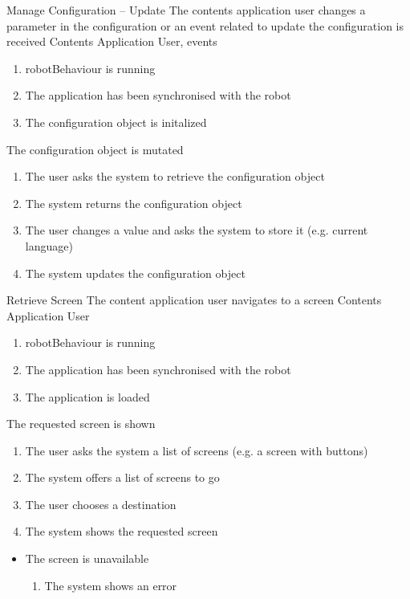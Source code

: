 \begin{suc}
{Manage Configuration -- Update}
{The contents application user changes a parameter in the configuration or an event related to update the configuration is received}
{Contents Application User, events}
{
	\begin{enumerate}
        \item robotBehaviour is running
        \item The application has been synchronised with the robot
        \item The configuration object is initalized
    \end{enumerate}
}
{
The configuration object is mutated
}
{
    \begin{enumerate}
        \item The user asks the system to retrieve the configuration object
        \item The system returns the configuration object
        \item The user changes a value and asks the system to store it (e.g. current language)
		\item The system updates the configuration object
    \end{enumerate}
}
{     
}
\end{suc}


\begin{suc}
{Retrieve Screen}
{The content application user navigates to a screen }
{Contents Application User}
{
	\begin{enumerate}
        \item robotBehaviour is running
        \item The application has been synchronised with the robot
        \item The application is loaded
    \end{enumerate}
}
{
The requested screen is shown
}
{
    \begin{enumerate}
		\item The user asks the system a list of screens (e.g. a screen with buttons)
        \item The system offers a list of screens to go
        \item The user chooses a destination
        \item The system shows the requested screen
    \end{enumerate}
}
{
    \begin{itemize}
	    \item The screen is unavailable
	    \begin{enumerate}
	    	\item The system shows an error
	    \end{enumerate}
    \end{itemize}
		
}
\end{suc}

